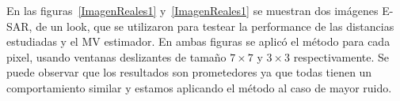 En las figuras~\ref{ImagenReales1} y~\ref{ImagenReales1} se muestran dos imágenes E-SAR, de un look, que se utilizaron para testear la performance de las distancias estudiadas y el MV estimador. En ambas figuras se aplicó el método para cada pixel, usando ventanas deslizantes de tamaño $7 \times 7$ y $3 \times 3$ respectivamente. Se puede observar que los resultados son prometedores ya que todas tienen un comportamiento similar y estamos aplicando el método al caso de mayor ruido.


\begin{figure}[htb]
	\begin{minipage}[b]{0.45\linewidth} %
		\centering
		\\

\end{minipage}
\end{figure}
